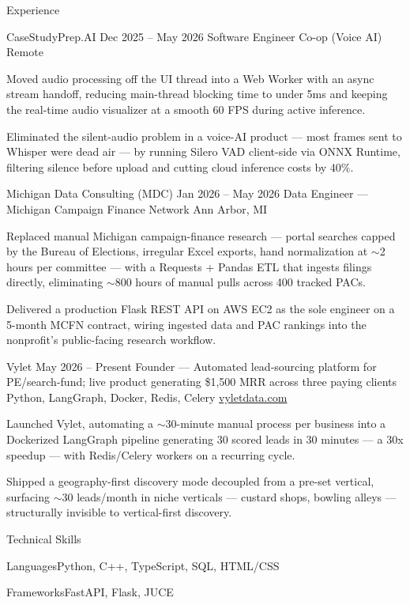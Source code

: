 \documentclass[
	11pt
]{../../../template}
\begin{document}
	\begin{rSection}{E}{xperience}
		\begin{rSectionEntry}
			{CaseStudyPrep.AI}
			{Dec 2025 -- May 2026}
			{Software Engineer Co-op (Voice AI)}
			{}
			{Remote}

			\item Moved audio processing off the UI thread into a Web Worker with an async stream handoff, reducing main-thread blocking time to under 5ms and keeping the real-time audio visualizer at a smooth 60 FPS during active inference.
			\item Eliminated the silent-audio problem in a voice-AI product --- most frames sent to Whisper were dead air --- by running Silero VAD client-side via ONNX Runtime, filtering silence before upload and cutting cloud inference costs by 40\%.
		\end{rSectionEntry}

		\begin{rSectionEntry}
			{Michigan Data Consulting (MDC)}
			{Jan 2026 -- May 2026}
			{Data Engineer --- Michigan Campaign Finance Network}
			{}
			{Ann Arbor, MI}

			\item Replaced manual Michigan campaign-finance research --- portal searches capped by the Bureau of Elections, irregular Excel exports, hand normalization at $\sim$2 hours per committee --- with a Requests + Pandas ETL that ingests filings directly, eliminating $\sim$800 hours of manual pulls across 400 tracked PACs.
			\item Delivered a production Flask REST API on AWS EC2 as the sole engineer on a 5-month MCFN contract, wiring ingested data and PAC rankings into the nonprofit's public-facing research workflow.
		\end{rSectionEntry}

		\begin{rSectionEntry}
			{Vylet}
			{May 2026 -- Present}
			{Founder --- Automated lead-sourcing platform for PE/search-fund; live product generating \$1,500 MRR across three paying clients}
			{Python, LangGraph, Docker, Redis, Celery}
			{\href{https://vyletdata.com}{vyletdata.com}}

			\item Launched Vylet, automating a $\sim$30-minute manual process per business into a Dockerized LangGraph pipeline generating 30 scored leads in 30 minutes --- a 30x speedup --- with Redis/Celery workers on a recurring cycle.
			\item Shipped a geography-first discovery mode decoupled from a pre-set vertical, surfacing $\sim$30 leads/month in niche verticals --- custard shops, bowling alleys --- structurally invisible to vertical-first discovery.
		\end{rSectionEntry}
	\end{rSection}

	\begin{rSection}{T}{echnical Skills}
		\begin{rSet}{Languages}{Python, C++, TypeScript, SQL, HTML/CSS}
		\end{rSet}
		\begin{rSet}{Frameworks}{FastAPI, Flask, JUCE}
		\end{rSet}
	\end{rSection}
\end{document}
